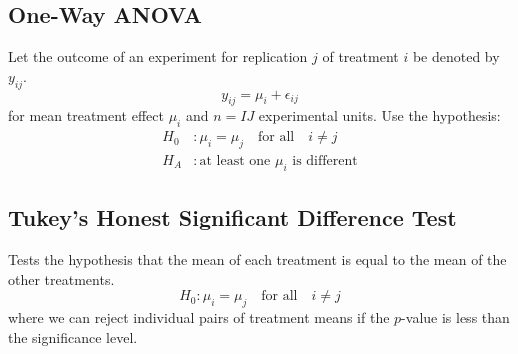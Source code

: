 \documentclass{article}
\begin{document}
\begin{multicols}{3}
    \subsection{One-Way ANOVA}
    Let the outcome of an experiment for replication \(j\) of treatment \(i\) be denoted by \(y_{ij}\).
    \begin{equation*}
        y_{ij} = \mu_i + \epsilon_{ij}
    \end{equation*}
    for mean treatment effect \(\mu_i\) and \(n = IJ\) experimental units.
    Use the hypothesis:
    \begin{align*}
        H_0 & : \mu_i = \mu_j \quad \text{for all} \quad i \neq j \\
        H_A & : \text{at least one \(\mu_i\) is different}
    \end{align*}
    \subsection{Tukey's Honest Significant Difference Test}
    Tests the hypothesis that the mean of each treatment is equal to the mean of the other treatments.
    \begin{equation*}
        H_0 : \mu_i = \mu_j \quad \text{for all} \quad i \neq j
    \end{equation*}
    where we can reject individual pairs of treatment means if the \(p\)-value is less than the significance level.

\end{multicols}
\end{document}
